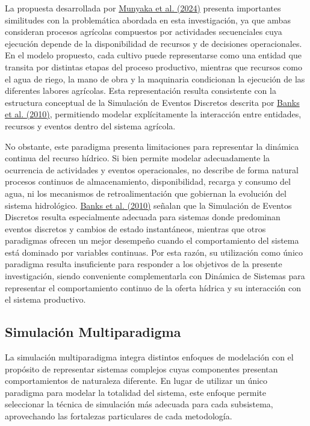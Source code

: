 \documentclass[12pt]{report}
\newcommand{\citeref}[2]{\hyperlink{ref:#1}{#2}}
\begin{document}
La propuesta desarrollada por \citeref{munyaka2024}{Munyaka et al. (2024)} presenta importantes similitudes con la problemática abordada en esta investigación, ya que ambas consideran procesos agrícolas compuestos por actividades secuenciales cuya ejecución depende de la disponibilidad de recursos y de decisiones operacionales. En el modelo propuesto, cada cultivo puede representarse como una entidad que transita por distintas etapas del proceso productivo, mientras que recursos como el agua de riego, la mano de obra y la maquinaria condicionan la ejecución de las diferentes labores agrícolas. Esta representación resulta consistente con la estructura conceptual de la Simulación de Eventos Discretos descrita por \citeref{banks2010}{Banks et al. (2010)}, permitiendo modelar explícitamente la interacción entre entidades, recursos y eventos dentro del sistema agrícola.

No obstante, este paradigma presenta limitaciones para representar la dinámica continua del recurso hídrico. Si bien permite modelar adecuadamente la ocurrencia de actividades y eventos operacionales, no describe de forma natural procesos continuos de almacenamiento, disponibilidad, recarga y consumo del agua, ni los mecanismos de retroalimentación que gobiernan la evolución del sistema hidrológico. \citeref{banks2010}{Banks et al. (2010)} señalan que la Simulación de Eventos Discretos resulta especialmente adecuada para sistemas donde predominan eventos discretos y cambios de estado instantáneos, mientras que otros paradigmas ofrecen un mejor desempeño cuando el comportamiento del sistema está dominado por variables continuas. Por esta razón, su utilización como único paradigma resulta insuficiente para responder a los objetivos de la presente investigación, siendo conveniente complementarla con Dinámica de Sistemas para representar el comportamiento continuo de la oferta hídrica y su interacción con el sistema productivo.

\subsection{Simulación Multiparadigma}

La simulación multiparadigma integra distintos enfoques de modelación con el propósito de representar sistemas complejos cuyas componentes presentan comportamientos de naturaleza diferente. En lugar de utilizar un único paradigma para modelar la totalidad del sistema, este enfoque permite seleccionar la técnica de simulación más adecuada para cada subsistema, aprovechando las fortalezas particulares de cada metodología.
\end{document}
